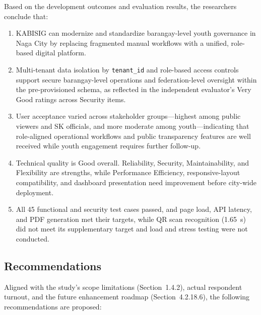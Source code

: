 \hspace*{\parindent}Based on the development outcomes and evaluation results, the researchers conclude that:
\vspace{3mm}

\begin{enumerate}
    \item KABISIG can modernize and standardize barangay-level youth governance in Naga City by replacing fragmented manual workflows with a unified, role-based digital platform.
    \item Multi-tenant data isolation by \texttt{tenant\_id} and role-based access controls support secure barangay-level operations and federation-level oversight within the pre-provisioned schema, as reflected in the independent evaluator's Very Good ratings across Security items.
    \item User acceptance varied across stakeholder groups---highest among public viewers and SK officials, and more moderate among youth---indicating that role-aligned operational workflows and public transparency features are well received while youth engagement requires further follow-up.
    \item Technical quality is Good overall. Reliability, Security, Maintainability, and Flexibility are strengths, while Performance Efficiency, responsive-layout compatibility, and dashboard presentation need improvement before city-wide deployment.
    \item All 45 functional and security test cases passed, and page load, API latency, and PDF generation met their targets, while QR scan recognition (1.65~s) did not meet its supplementary target and load and stress testing were not conducted.
\end{enumerate}
\vspace{5mm}

\subsection{Recommendations}
\label{subsec:recommendations}

\hspace*{\parindent}Aligned with the study's scope limitations (Section~1.4.2), actual respondent turnout, and the future enhancement roadmap (Section~4.2.18.6), the following recommendations are proposed:
\vspace{3mm}

